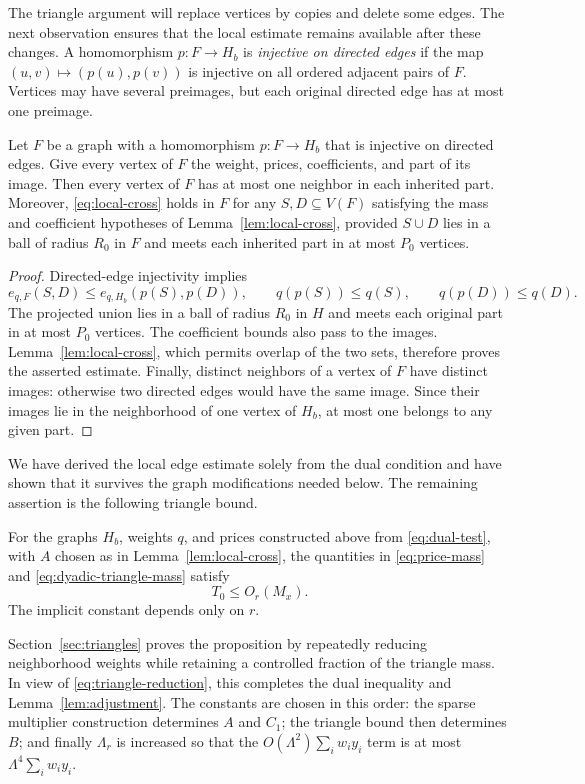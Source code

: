 The triangle argument will replace vertices by copies and delete some
edges.  The next observation ensures that the local estimate remains
available after these changes.  A homomorphism $p:F\to H_b$ is
\emph{injective on directed edges} if the map
$(u,v)\mapsto(p(u),p(v))$ is injective on all ordered adjacent pairs of
$F$.  Vertices may have several preimages, but each original directed
edge has at most one preimage.

\begin{corollary}
\label{lem:local-cross-transfer}
Let $F$ be a graph with a homomorphism $p:F\to H_b$ that is injective
on directed edges.  Give every vertex of $F$ the weight, prices,
coefficients, and part of its image.  Then every vertex of $F$ has at
most one neighbor in each inherited part.  Moreover,
\eqref{eq:local-cross} holds in $F$ for any $S,D\subseteq V(F)$
satisfying the mass and coefficient hypotheses of
Lemma~\ref{lem:local-cross}, provided $S\cup D$ lies in a ball of
radius $R_0$ in $F$ and meets each inherited part in at most $P_0$
vertices.
\end{corollary}

\begin{proof}
Directed-edge injectivity implies
\[
 e_{q,F}(S,D)\le e_{q,H_b}(p(S),p(D)),\qquad
 q(p(S))\le q(S),\qquad q(p(D))\le q(D).
\]
The projected union lies in a ball of radius $R_0$ in $H$ and meets
each original part in at most $P_0$ vertices.  The coefficient bounds
also pass to the images.  Lemma~\ref{lem:local-cross}, which permits
overlap of the two sets, therefore proves the asserted estimate.
Finally, distinct neighbors of a vertex of $F$ have distinct images:
otherwise two directed edges would have the same image.  Since their
images lie in the neighborhood of one vertex of $H_b$, at most one
belongs to any given part.
\end{proof}

We have derived the local edge estimate solely from the dual condition
and have shown that it survives the graph modifications needed below.
The remaining assertion is the following triangle bound.

\begin{proposition}
\label{prop:triangle-bound}
For the graphs $H_b$, weights $q$, and prices constructed above from
\eqref{eq:dual-test}, with $A$ chosen as in
Lemma~\ref{lem:local-cross}, the quantities in
\eqref{eq:price-mass} and \eqref{eq:dyadic-triangle-mass} satisfy
\[
 T_0\le O_r(M_x).
\]
The implicit constant depends only on $r$.
\end{proposition}

Section~\ref{sec:triangles} proves the proposition by repeatedly
reducing neighborhood weights while retaining a controlled fraction of
the triangle mass.  In view of \eqref{eq:triangle-reduction}, this
completes the dual inequality and Lemma~\ref{lem:adjustment}.  The
constants are chosen in this order: the sparse multiplier construction
determines $A$ and $C_1$; the triangle bound then determines $B$; and
finally $\Lambda_r$ is increased so that the
$O(\Lambda^2)\sum_iw_i y_i$ term is at most
$\Lambda^4\sum_iw_i y_i$.
